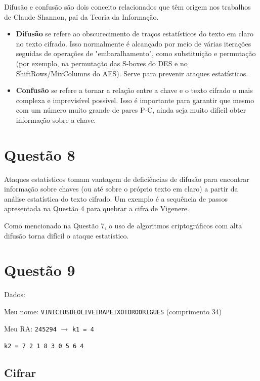 \documentclass{article}
\begin{document}
    Difusão e confusão são dois conceito relacionados que têm origem nos trabalhos de Claude Shannon, pai da Teoria da Informação.

    \begin{itemize}
        \item \textbf{Difusão} se refere ao obscurecimento de traços estatísticos do texto em claro no texto cifrado. Isso normalmente é alcançado por meio de várias iterações seguidas de operações de  "embaralhamento", como substituição e permutação (por exemplo, na permutação das S-boxes do DES e no ShiftRows/MixColumns do AES). Serve para prevenir ataques estatísticos.
        \item \textbf{Confusão} se refere a tornar a relação entre a chave e o texto cifrado o mais complexa e imprevisível possível. Isso é importante para garantir que mesmo com um número muito grande de pares P-C, ainda seja muito difícil obter informação sobre a chave.
    \end{itemize}

    \section*{Questão 8}

    Ataques estatísticos tomam vantagem de deficiências de difusão para encontrar informação sobre chaves (ou até sobre o próprio texto em claro) a partir da análise estatística do texto cifrado. Um exemplo é a sequência de passos apresentada na Questão 4 para quebrar a cifra de Vigenere.

    Como mencionado na Questão 7, o uso de algoritmos criptográficos com alta difusão torna difícil o ataque estatístico.

    \section*{Questão 9}

    Dados:

    Meu nome: \texttt{VINICIUSDEOLIVEIRAPEIXOTORODRIGUES} (comprimento 34)

    Meu RA: \texttt{245294} $\rightarrow$ \texttt{k1 = 4}

    \texttt{k2 = 7 2 1 8 3 0 5 6 4}

    \subsection*{Cifrar}
    
\end{document}
